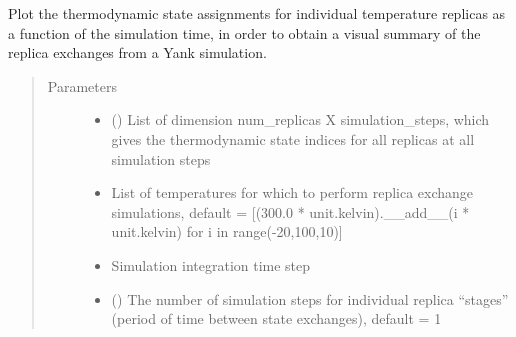 \documentclass[letterpaper,12pt,english,openany,oneside]{sphinxmanual}
\begin{document}
\begin{fulllineitems}
\label{\detokenize{simulation:simulation.rep_exch.plot_replica_exchange_summary}}
Plot the thermodynamic state assignments for individual temperature replicas as a function of the simulation time, in order to obtain a visual summary of the replica exchanges from a Yank simulation.
\begin{quote}\begin{description}
\item[{Parameters}] \leavevmode\begin{itemize}
\item {} 
 (\sphinxstyleliteralemphasis{\sphinxupquote{( }}\sphinxstyleliteralemphasis{\sphinxupquote{( }}\sphinxstyleliteralemphasis{\sphinxupquote{ ) }}\sphinxstyleliteralemphasis{\sphinxupquote{ )}}) \textendash{} List of dimension num\_replicas X simulation\_steps, which gives the thermodynamic state indices for all replicas at all simulation steps

\item {} 
 \textendash{} List of temperatures for which to perform replica exchange simulations, default = {[}(300.0 * unit.kelvin).\_\_add\_\_(i * unit.kelvin) for i in range(-20,100,10){]}

\item {} 
 \textendash{} Simulation integration time step

\item {} 
 () \textendash{} The number of simulation steps for individual replica “stages” (period of time between state exchanges), default = 1


\end{itemize}
\end{description}
\end{quote}
\end{fulllineitems}
\end{document}

